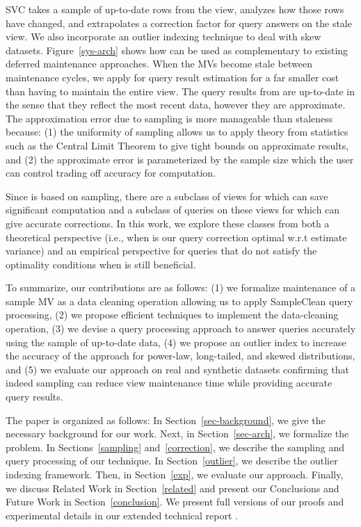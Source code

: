 SVC takes a sample of up-to-date rows from the view, analyzes how those rows have changed, and extrapolates a correction factor for query answers on the stale view. We also incorporate an outlier indexing technique to deal with skew datasets. 
Figure~\ref{sys-arch} shows how \svc can be used as complementary to existing deferred maintenance approaches. 
When the MVs become stale between maintenance cycles, we apply \svc for query result estimation for a far smaller cost than having to maintain the entire view.
The query results from \svc are up-to-date in the sense that they reflect the most recent data, however they are approximate. 
The approximation error due to sampling is more manageable than staleness because: (1) the uniformity of sampling allows us to apply theory from statistics such as the Central Limit Theorem to give tight bounds on approximate results, and (2) the approximate error is parameterized by the sample size which the user can control trading off accuracy for computation.




Since \svc is based on sampling, there are a subclass of views for which \svc can save significant computation and a subclass of queries on these views for which \svc can give accurate corrections.
In this work, we explore these classes from both a theoretical perspective (i.e., when is our query correction optimal w.r.t estimate variance) and an empirical perspective for queries that do not satisfy the optimality conditions when is \svc still beneficial.

To summarize, our contributions are as follows: (1) we formalize maintenance of a sample MV as a data cleaning operation allowing us to apply SampleClean query processing, (2) we propose efficient techniques to implement the data-cleaning operation, (3) we devise a query processing approach to answer queries accurately using the sample of up-to-date data, (4) we propose an outlier index to increase the accuracy of the approach for power-law, long-tailed, and skewed distributions, and (5) we evaluate our approach on real and synthetic datasets confirming that indeed sampling can reduce view maintenance time while providing accurate query results. 

The paper is organized as follows: 
In Section~\ref{sec-background}, we give the necessary background for our work.
Next, in Section~\ref{sec-arch}, we formalize the problem.
In Sections~\ref{sampling} and~\ref{correction}, we describe the sampling and query processing of our technique.
In Section~\ref{outlier}, we describe the outlier indexing framework.
Then, in Section~\ref{exp}, we evaluate our approach.
Finally, we discuss Related Work in Section~\ref{related} and present our Conclusions and Future Work in Section~\ref{conclusion}.
We present full versions of our proofs and experimental details in our extended technical report \cite{technicalReport}.

